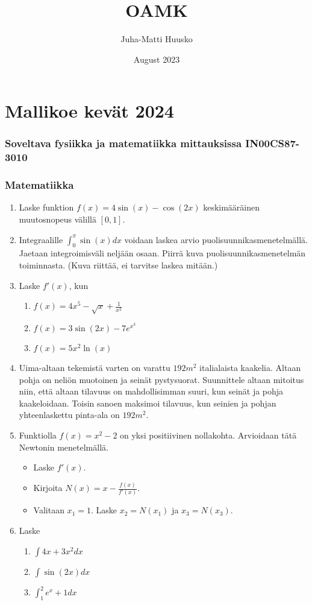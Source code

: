 \documentclass[12pt]{article}
\title{OAMK}
\author{Juha-Matti Huusko}
\date{August 2023}
\begin{document}
\thispagestyle{empty}

\section*{Mallikoe kevät 2024}
\subsubsection*{Soveltava fysiikka ja matematiikka mittauksissa IN00CS87-3010}
\subsubsection*{Matematiikka}

\begin{enumerate}
\item Laske funktion $f(x)=4\sin(x)-\cos(2x)$ keskimääräinen muutosnopeus välillä $[0,1]$.
\item Integraalille $\int_0^\pi \sin(x)dx$ voidaan laskea arvio puolisuunnikasmenetelmällä. Jaetaan integroimisväli neljään osaan. Piirrä kuva puolisuunnikasmenetelmän toiminnasta. (Kuva riittää, ei tarvitse laskea mitään.)
\item Laske $f'(x)$, kun
\begin{enumerate}
\item $f(x)=4x^5-\sqrt{x}+\frac{1}{x^2}$
\item $f(x)=3\sin(2x)-7e^{x^3}$
\item $f(x)=5x^2\ln(x)$
\end{enumerate}
\item Uima-altaan tekemistä varten on varattu $192 m^2$ italialaista kaakelia. Altaan pohja on neliön muotoinen ja seinät pystysuorat. Suunnittele altaan mitoitus niin, että altaan tilavuus on mahdollisimman suuri, kun seinät ja pohja kaakeloidaan. Toisin sanoen maksimoi tilavuus, kun seinien ja pohjan yhteenlaskettu pinta-ala on $192m^2$.
 \item Funktiolla $f(x)=x^2-2$ on yksi positiivinen nollakohta. Arvioidaan tätä Newtonin menetelmällä.
\begin{itemize}
\item Laske $f'(x)$.
\item Kirjoita $N(x)=x-\frac{f(x)}{f'(x)}$.
\item Valitaan $x_1=1$. Laske $x_2=N(x_1)$ ja $x_3=N(x_3)$.
\end{itemize}
\item Laske
\begin{enumerate}
\item $\int 4x+3x^2dx$
\item $\int \sin(2x)dx$
\item $\int_1^2 e^{x}+1dx$
\end{enumerate}
\end{enumerate}
\end{document}

